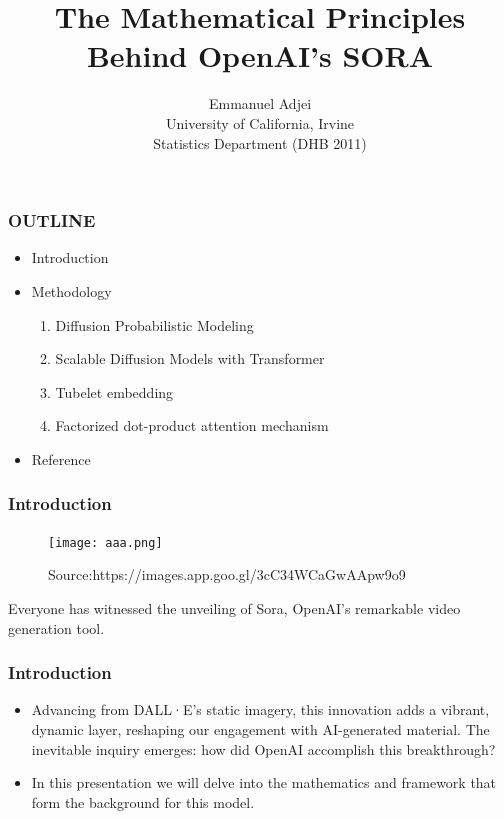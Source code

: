\documentclass[11pt]{beamer}
\begin{document}
	\author{Emmanuel Adjei\\
	University of California, Irvine\\
	Statistics Department (DHB 2011)}
	\title{
		The Mathematical Principles Behind OpenAI's SORA }
	\begin{frame}[plain]
		\maketitle
	\end{frame}
	
	\begin{frame}
		\frametitle{OUTLINE}
		\begin{itemize}
			\item Introduction
			\item Methodology
			\begin{enumerate}
				\item Diffusion Probabilistic Modeling
				\item Scalable Diffusion Models with Transformer
				\item Tubelet embedding
				\item Factorized dot-product attention mechanism
				
			\end{enumerate}
			\item Reference
		\end{itemize}
	\end{frame}

\begin{frame}
	\frametitle{Introduction}
	
	\begin{figure}
		\centering
		\texttt{[image: aaa.png]} 
	\caption{Source:https://images.app.goo.gl/3cC34WCaGwAApw9o9}
		\label{fig: Source: https://images.app.goo.gl/3cC34WCaGwAApw9o9} %
	\end{figure}
	Everyone has witnessed the unveiling of Sora, OpenAI's remarkable video generation tool. 
	
\end{frame}

\begin{frame}
	\frametitle{Introduction}
\begin{itemize}
	\item Advancing from DALL·E's static imagery, this innovation adds a vibrant, dynamic layer, reshaping our engagement with AI-generated material. The inevitable inquiry emerges: how did OpenAI accomplish this breakthrough?
	\item In this presentation we will delve into the mathematics and framework that form the background  for this model. 
\end{itemize}
		
\end{frame}
\end{document}
